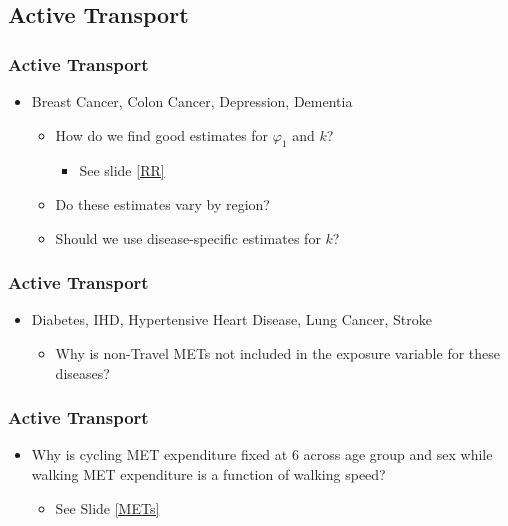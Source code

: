 \documentclass[handout,13pt,compress,c]{beamer}
\newcommand{\bi}{\begin{itemize}}
\newcommand{\ei}{\end{itemize}}
\begin{document}
\subsection{Active Transport}
\begin{frame}[fragile]
\frametitle{Active Transport}
\bi
\item Breast Cancer, Colon Cancer, Depression, Dementia
\bi\item How do we find good estimates for $\varphi_1$ and $k$?
\bi\item See slide \ref{RR}\ei
\item Do these estimates vary by region?
\item Should we use disease-specific estimates for $k$?
\ei 
\ei
\end{frame}
\begin{frame}[fragile]
\frametitle{Active Transport}
\bi
\item Diabetes, IHD, Hypertensive Heart Disease, Lung Cancer, Stroke
\bi\item Why is non-Travel METs not included in the exposure variable
for these diseases?\ei
\ei
\end{frame}
\begin{frame}[fragile]
\frametitle{Active Transport}
\bi\item Why is cycling MET expenditure fixed at 6 across age
group and sex while walking MET expenditure is a function of walking
speed? 
\bi\item See Slide \ref{METs}\ei
\ei
\end{frame}
\end{document}
